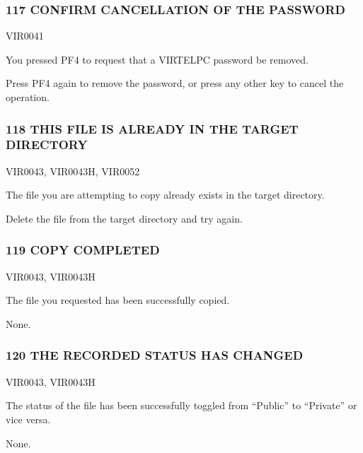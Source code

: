 \documentclass[letterpaper,10pt,english]{sphinxmanual}
\begin{document}
\subsubsection{117 CONFIRM CANCELLATION OF THE PASSWORD}
\label{\detokenize{messages:confirm-cancellation-of-the-password}}\begin{description}
\sphinxAtStartPar
VIR0041

\sphinxAtStartPar
You pressed PF4 to request that a VIRTELPC password be removed.

\sphinxAtStartPar
Press PF4 again to remove the password, or press any other key to cancel the operation.

\end{description}


\subsubsection{118 THIS FILE IS ALREADY IN THE TARGET DIRECTORY}
\label{\detokenize{messages:this-file-is-already-in-the-target-directory}}\begin{description}
\sphinxAtStartPar
VIR0043, VIR0043H, VIR0052

\sphinxAtStartPar
The file you are attempting to copy already exists in the target directory.

\sphinxAtStartPar
Delete the file from the target directory and try again.

\end{description}


\subsubsection{119 COPY COMPLETED}
\label{\detokenize{messages:copy-completed}}\begin{description}
\sphinxAtStartPar
VIR0043, VIR0043H

\sphinxAtStartPar
The file you requested has been successfully copied.

\sphinxAtStartPar
None.

\end{description}


\subsubsection{120 THE RECORDED STATUS HAS CHANGED}
\label{\detokenize{messages:the-recorded-status-has-changed}}\begin{description}
\sphinxAtStartPar
VIR0043, VIR0043H

\sphinxAtStartPar
The status of the file has been successfully toggled from “Public” to “Private” or vice versa.

\sphinxAtStartPar
None.

\end{description}
\end{document}
